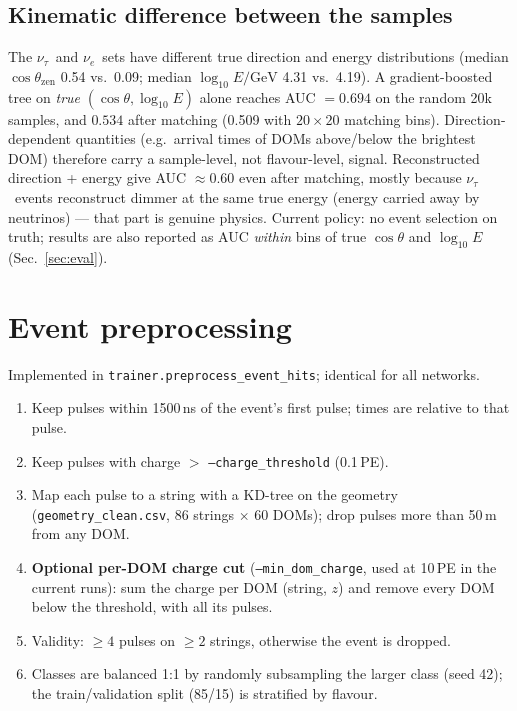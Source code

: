 \documentclass[11pt,a4paper]{article}
\newcommand{\nutau}{\ensuremath{\nu_\tau}}
\newcommand{\nue}{\ensuremath{\nu_e}}
\newcommand{\code}[1]{\texttt{#1}}
\begin{document}
\subsection{Kinematic difference between the samples}\label{sec:confound}
The \nutau\ and \nue\ sets have different true direction and energy distributions (median
$\cos\theta_\mathrm{zen}$ 0.54 vs.\ 0.09; median $\log_{10}E/\mathrm{GeV}$ 4.31 vs.\ 4.19). A gradient-boosted tree on
\emph{true} $(\cos\theta,\log_{10}E)$ alone reaches AUC $=0.694$ on the random 20k samples, and $0.534$ after matching
(0.509 with $20\times20$ matching bins). Direction-dependent quantities (e.g.\ arrival times of DOMs above/below the
brightest DOM) therefore carry a sample-level, not flavour-level, signal. Reconstructed direction + energy give AUC
$\approx0.60$ even after matching, mostly because \nutau\ events reconstruct dimmer at the same true energy (energy
carried away by neutrinos) --- that part is genuine physics. Current policy: no event selection on truth; results are
also reported as AUC \emph{within} bins of true $\cos\theta$ and $\log_{10}E$ (Sec.~\ref{sec:eval}).

\section{Event preprocessing}
Implemented in \code{trainer.preprocess\_event\_hits}; identical for all networks.
\begin{enumerate}
  \item Keep pulses within 1500\,ns of the event's first pulse; times are relative to that pulse.
  \item Keep pulses with charge $>$ \code{--charge\_threshold} (0.1\,PE).
  \item Map each pulse to a string with a KD-tree on the geometry (\code{geometry\_clean.csv}, 86 strings $\times$ 60 DOMs);
        drop pulses more than 50\,m from any DOM.
  \item \textbf{Optional per-DOM charge cut} (\code{--min\_dom\_charge}, used at 10\,PE in the current runs): sum the
        charge per DOM (string, $z$) and remove every DOM below the threshold, with all its pulses.
  \item Validity: $\geq4$ pulses on $\geq2$ strings, otherwise the event is dropped.
  \item Classes are balanced 1:1 by randomly subsampling the larger class (seed 42); the train/validation split
        (85/15) is stratified by flavour.
\end{enumerate}
\end{document}
